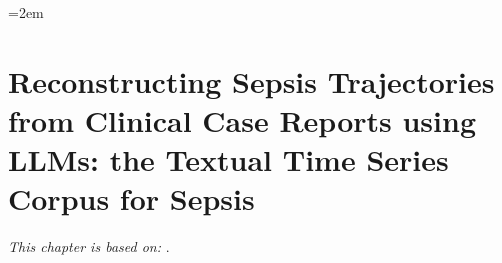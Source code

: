 \begingroup
\ChSixBegin
\emergencystretch=2em
\chapter{Reconstructing Sepsis Trajectories from Clinical Case Reports using LLMs: the Textual Time Series Corpus for Sepsis}\label{chap:ch06}
\noindent\emph{This chapter is based on:} \cite{pmlr-v333-noroozizadeh26a}.\par\smallskip

% 














% 

\clearpage
\endgroup
